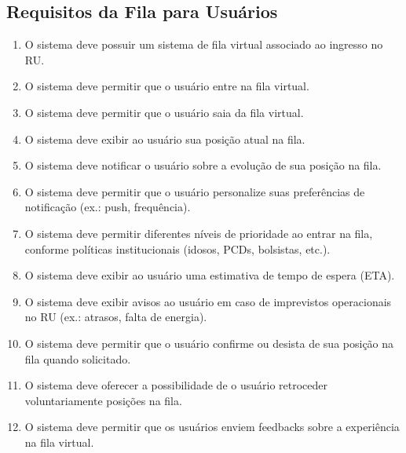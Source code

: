 \documentclass[12pt,a4paper]{article}
\begin{document}
\subsection{Requisitos da Fila para Usuários}
\begin{enumerate}[label=\textbf{RF-FIL-U-\arabic*}, leftmargin=*, align=left]
    \item O sistema deve possuir um sistema de fila virtual associado ao ingresso no RU.
    \item O sistema deve permitir que o usuário entre na fila virtual.
    \item O sistema deve permitir que o usuário saia da fila virtual.
    \item O sistema deve exibir ao usuário sua posição atual na fila.
    \item O sistema deve notificar o usuário sobre a evolução de sua posição na fila.
    \item O sistema deve permitir que o usuário personalize suas preferências de notificação (ex.: push, frequência).
    \item O sistema deve permitir diferentes níveis de prioridade ao entrar na fila, conforme políticas institucionais (idosos, PCDs, bolsistas, etc.).
    \item O sistema deve exibir ao usuário uma estimativa de tempo de espera (ETA).
    \item O sistema deve exibir avisos ao usuário em caso de imprevistos operacionais no RU (ex.: atrasos, falta de energia).
    \item O sistema deve permitir que o usuário confirme ou desista de sua posição na fila quando solicitado.
    \item O sistema deve oferecer a possibilidade de o usuário retroceder voluntariamente posições na fila.
    \item O sistema deve permitir que os usuários enviem feedbacks sobre a experiência na fila virtual.
\end{enumerate}
\end{document}
